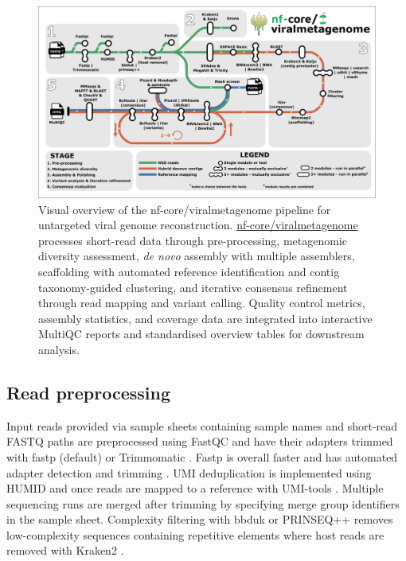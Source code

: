 \begin{figure}[htbp]
    \centering
    \includegraphics[width=1\textwidth]{Fig/fig1.png}
    \caption{Visual overview of the nf-core/viralmetagenome pipeline for untargeted viral genome reconstruction. \href{https://github.com/nf-core/viralmetagenome}{nf-core/viralmetagenome} processes short-read data through pre-processing, metagenomic diversity assessment, \textit{de novo} assembly with multiple assemblers, scaffolding with automated reference identification and contig taxonomy-guided clustering, and iterative consensus refinement through read mapping and variant calling. Quality control metrics, assembly statistics, and coverage data are integrated into interactive MultiQC reports and standardised overview tables for downstream analysis.}
    \label{fig:pipeline-workflow}
\end{figure}

\subsection{Read preprocessing}

Input reads provided via sample sheets containing sample names and short-read FASTQ paths are preprocessed using FastQC and have their adapters trimmed with fastp \citep{Chen2018-tu} (default) or Trimmomatic \citep{Bolger2014-si}. Fastp is overall faster and has automated adapter detection and trimming \citep{Chen2018-tu}. UMI deduplication is implemented using HUMID \citep{LarosUnknown-nx} and once reads are mapped to a reference with UMI-tools \citep{Smith2017-nk}. Multiple sequencing runs are merged after trimming by specifying merge group identifiers in the sample sheet. Complexity filtering with bbduk \citep{BushnellUnknown-qy} or PRINSEQ++ \citep{Cantu2019-vs} removes low-complexity sequences containing repetitive elements where host reads are removed with Kraken2 \citep{Wood2019-jl}.

